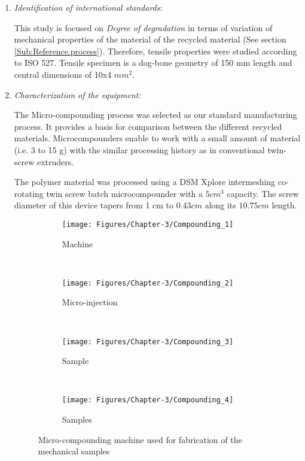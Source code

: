 \begin{enumerate}[leftmargin=0in, label=\emph{\alph*}.]
	\item  \textit{Identification of international standards}: 

	
	This study is focused on \textit{Degree of degradation}  in terms of variation of mechanical properties of the material of the recycled material (See section \ref{Sub:Reference.process}). 
	Therefore, tensile  properties were studied according to ISO 527.
	Tensile specimen is a dog-bone geometry of 150 mm length and central dimensions of 10x4 $mm^2$. 
	
	\item  \textit{Characterization of the equipment:}

	
The Micro-compounding process was selected as our standard manufacturing process.  
It provides a basis for comparison between the different recycled materials.
Microcompounders enable to work with a small amount of material (i.e. 3 to 15 g) with the similar processing history as in  conventional twin-screw extruders.


The polymer material was processed using a  DSM Xplore intermeshing co-rotating twin screw batch microcompounder with a $5cm^{3}$ capacity. 
The screw diameter of this device tapers from 1 cm to $0.43 cm$ along its $10.75 cm$ length. 


\begin{figure}[H]
	\centering
	\begin{subfigure}[b]{0.19\textwidth}
		\centering
		\texttt{[image: Figures/Chapter-3/Compounding\_1]}
		\caption{Machine}
	\end{subfigure}%
	~ 
	\begin{subfigure}[b]{0.29\textwidth}
		\centering
		\texttt{[image: Figures/Chapter-3/Compounding\_2]}
		\caption{Micro-injection}
	\end{subfigure}
	~ 
	\begin{subfigure}[b]{0.19\textwidth}
		\centering
		\texttt{[image: Figures/Chapter-3/Compounding\_3]}
		\caption{Sample}
	\end{subfigure}%
	~ 
	\begin{subfigure}[b]{0.29\textwidth}
		\centering
		\texttt{[image: Figures/Chapter-3/Compounding\_4]}
		\caption{Samples }
	\end{subfigure}
	\caption{Micro-compounding machine used for fabrication of the mechanical samples}
\end{figure}
	

\end{enumerate}
